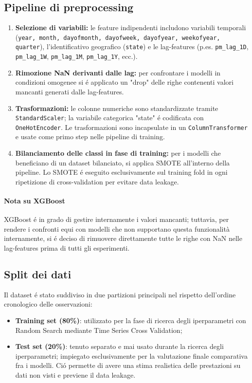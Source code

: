 \documentclass[a4paper,12pt]{report}
\begin{document}
	\subsection{Pipeline di preprocessing}
	\begin{enumerate}
		\item \textbf{Selezione di variabili:} le feature indipendenti includono variabili temporali (\texttt{year, month, dayofmonth, dayofweek, dayofyear, weekofyear, quarter}), l'identificativo geografico (\texttt{state}) e le lag-features (p.es. \texttt{pm\_lag\_1D}, \texttt{pm\_lag\_1W}, \texttt{pm\_lag\_1M}, \texttt{pm\_lag\_1Y}, ecc.).
		\item \textbf{Rimozione NaN derivanti dalle lag:} per confrontare i modelli in condizioni omogenee si é applicato un "drop" delle righe contenenti valori mancanti generati dalle lag-features.
		\item \textbf{Trasformazioni:} le colonne numeriche sono standardizzate tramite \texttt{StandardScaler}; la variabile categorica "state" é codificata con \texttt{OneHotEncoder}. Le trasformazioni sono incapsulate in un \texttt{ColumnTransformer} e usate come primo step nelle pipeline di training.
		\item \textbf{Bilanciamento delle classi in fase di training:} per i modelli che beneficiano di un dataset bilanciato, si applica SMOTE all'interno della pipeline. Lo SMOTE é eseguito esclusivamente sul training fold in ogni ripetizione di cross-validation per evitare data leakage.
	\end{enumerate}
	
	\paragraph{Nota su XGBoost} XGBoost é in grado di gestire internamente i valori mancanti; tuttavia, per rendere i confronti equi con modelli che non supportano questa funzionalità internamente, si é deciso di rimuovere direttamente tutte le righe con NaN nelle lag-features prima di tutti gli esperimenti.
	
	\subsection{Split dei dati}
	Il dataset é stato suddiviso in due partizioni principali nel rispetto dell'ordine cronologico delle osservazioni:
	
	\begin{itemize}
		\item \textbf{Training set (80\%)}: utilizzato per la fase di ricerca degli iperparametri con Random Search mediante Time Series Cross Validation;
		\item \textbf{Test set (20\%)}: tenuto separato e mai usato durante la ricerca degli iperparametri; impiegato esclusivamente per la valutazione finale comparativa fra i modelli. Ció permette di avere una stima realistica delle prestazioni su dati non visti e previene il data leakage.
	\end{itemize}
	
\end{document}

